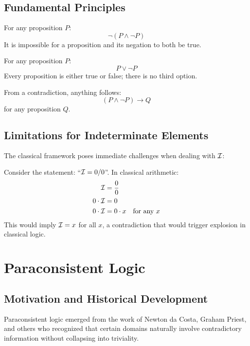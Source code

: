 \subsection{Fundamental Principles}

\begin{axiom}
For any proposition $P$:
\[
\neg(P \land \neg P)
\]
It is impossible for a proposition and its negation to both be true.
\end{axiom}

\begin{axiom}
For any proposition $P$:
\[
P \lor \neg P
\]
Every proposition is either true or false; there is no third option.
\end{axiom}

\begin{axiom}
From a contradiction, anything follows:
\[
(P \land \neg P) \rightarrow Q
\]
for any proposition $Q$.
\end{axiom}

\subsection{Limitations for Indeterminate Elements}

The classical framework poses immediate challenges when dealing with $\mathcal{I}$:

\begin{example}
Consider the statement: ``$\mathcal{I} = 0/0$''. In classical arithmetic:
\begin{align*}
    \mathcal{I} &= \frac{0}{0} \\
    0 \cdot \mathcal{I} &= 0 \\
    0 \cdot \mathcal{I} &= 0 \cdot x \quad \text{for any } x
\end{align*}
This would imply $\mathcal{I} = x$ for all $x$, a contradiction that would trigger explosion in classical logic.
\end{example}

\section{Paraconsistent Logic}

\subsection{Motivation and Historical Development}

Paraconsistent logic emerged from the work of Newton da Costa, Graham Priest, and others who recognized that certain domains naturally involve contradictory information without collapsing into triviality.

